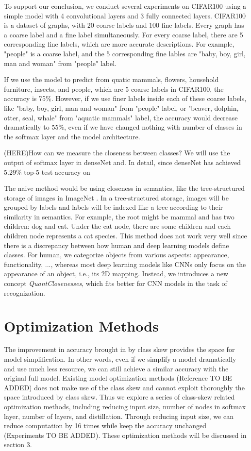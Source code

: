 \documentclass{article}
\begin{document}
To support our conclusion, we conduct several experiments on CIFAR100 using a simple model with 4 convolutional layers and 3 fully connected layers. CIFAR100 is a dataset of graphs, with 20 coarse labels and 100 fine labels. Every graph has a coarse label and a fine label simultaneously. For every coarse label, there are 5 corresponding fine labels, which are more accurate descriptions. For example, "people" is a coarse label, and the 5 corresponding fine lables are "baby, boy, girl, man and woman" from "people" label. 

If we use the model to predict from quatic mammals, flowers, household furniture, insects, and people, which are 5 coarse labels in CIFAR100, the accuracy is 75\%. However, if we use finer labels inside each of these coarse labels, like "baby, boy, girl, man and woman" from "people" label, or "beaver, dolphin, otter, seal, whale" from "aquatic mammals" label, the accuracy would decrease dramatically to 55\%, even if we have changed nothing with number of classes in the softmax layer and the model architecture.

(HERE)How can we measure the closeness between classes? We will use the output of softmax layer in denseNet and. In detail, since denseNet \cite{huang2017densely} has achieved 5.29\% top-5 test accuracy on 

The naive method would be using closeness in semantics, like the tree-structured storage of images in ImageNet \cite{imagenet_cvpr09}. In a tree-structured storage, images will be grouped by labels and labels will be indexed like a tree according to their similarity in semantics. For example, the root might be mammal and has two children: dog and cat. Under the cat node, there are some children and each children node represents a cat species. This method does not work very well since there is a discrepancy between how human and deep learning models define classes. For human, we categorize objects from various aspects: appearance, functionality, ..., whereas most deep learning models like CNNs only focus on the appearance of an object, i.e.,  its 2D mapping. Instead, we introduces a new concept \textit{QuantClosenesses}, which fits better for CNN models in the task of recognization.



\section{Optimization Methods}
The improvement in accuracy brought in by class skew provides the space for model simplification. In other words, even if we simplify a model dramatically and use much less resource, we can still achieve a similar accuracy with the original full model. Existing model optimization methods (Reference TO BE ADDED) does not make use of the class skew and cannot exploit thoroughly the space introduced by class skew. Thus we explore a series of class-skew related optimization methods, including reducing input size, number of nodes in softmax layer, number of layers, and distillation. Through reducing input size, we can reduce computation by 16 times while keep the accuracy unchanged (Experiments TO BE ADDED). These optimization methods will be discussed in section 3.
\end{document}
